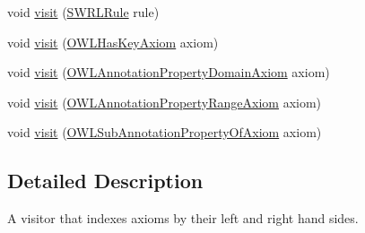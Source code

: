 \begin{DoxyCompactItemize}
\item 
void \hyperlink{classuk_1_1ac_1_1manchester_1_1cs_1_1owl_1_1explanation_1_1ordering_1_1_explanation_orderer_impl_1_1_axiom_map_builder_ac79df3ac09bf06c1fa7b471acf6fa290}{visit} (\hyperlink{interfaceorg_1_1semanticweb_1_1owlapi_1_1model_1_1_s_w_r_l_rule}{S\-W\-R\-L\-Rule} rule)
\item 
void \hyperlink{classuk_1_1ac_1_1manchester_1_1cs_1_1owl_1_1explanation_1_1ordering_1_1_explanation_orderer_impl_1_1_axiom_map_builder_a531c9416595e4e91245d5bc286e905a6}{visit} (\hyperlink{interfaceorg_1_1semanticweb_1_1owlapi_1_1model_1_1_o_w_l_has_key_axiom}{O\-W\-L\-Has\-Key\-Axiom} axiom)
\item 
void \hyperlink{classuk_1_1ac_1_1manchester_1_1cs_1_1owl_1_1explanation_1_1ordering_1_1_explanation_orderer_impl_1_1_axiom_map_builder_adaf4586bb4e45f725273610c8ed9238f}{visit} (\hyperlink{interfaceorg_1_1semanticweb_1_1owlapi_1_1model_1_1_o_w_l_annotation_property_domain_axiom}{O\-W\-L\-Annotation\-Property\-Domain\-Axiom} axiom)
\item 
void \hyperlink{classuk_1_1ac_1_1manchester_1_1cs_1_1owl_1_1explanation_1_1ordering_1_1_explanation_orderer_impl_1_1_axiom_map_builder_ad44851bb1cc98315857464f999fe2205}{visit} (\hyperlink{interfaceorg_1_1semanticweb_1_1owlapi_1_1model_1_1_o_w_l_annotation_property_range_axiom}{O\-W\-L\-Annotation\-Property\-Range\-Axiom} axiom)
\item 
void \hyperlink{classuk_1_1ac_1_1manchester_1_1cs_1_1owl_1_1explanation_1_1ordering_1_1_explanation_orderer_impl_1_1_axiom_map_builder_aa3a9d0143ccd832f5913f52ac2b30346}{visit} (\hyperlink{interfaceorg_1_1semanticweb_1_1owlapi_1_1model_1_1_o_w_l_sub_annotation_property_of_axiom}{O\-W\-L\-Sub\-Annotation\-Property\-Of\-Axiom} axiom)
\end{DoxyCompactItemize}


\subsection{Detailed Description}
A visitor that indexes axioms by their left and right hand sides. 

